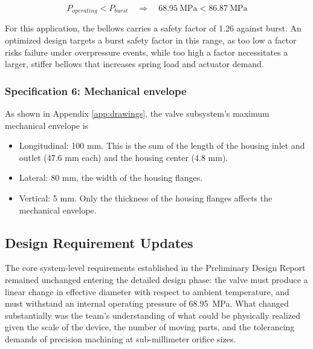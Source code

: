 \documentclass[12pt, letterpaper]{report}%
\newcounter{mycounter}           %
\newcounter{sub}[mycounter]      %
\newcommand{\specPressure}{68.95}%
\begin{document}
            \begin{equation}
            P_{operating} < P_{burst} \quad \Rightarrow \quad 68.95 \ \text{MPa} < 86.87 \ \text{MPa}
            \label{ineq_burst}
            \end{equation}

            For this application, the bellows carries a safety factor of 1.26 against burst.
            An optimized design targets a burst safety factor in this range, as too low a factor risks failure 
            under overpressure events, while too high a factor necessitates a larger, stiffer bellows that 
            increases spring load and actuator demand.

        \subsubsection{Specification 6: Mechanical envelope}
        \label{subsec:valve_spec_6}

            As shown in Appendix \ref{app:drawings}, the valve subsystem's maximum mechanical envelope is 
            \begin{itemize}
                \item Longitudinal: 100 mm. This is the sum of the length of the housing inlet and outlet (47.6 mm each) and the housing center (4.8 mm).
                \item Lateral: 80 mm, the width of the housing flanges.
                \item Vertical: 5 mm. Only the thickness of the housing flanges affects the mechanical envelope.
            \end{itemize}
        
        \subsection{Design Requirement Updates}
        \label{subsec:valve_req_updates}

                The core system-level requirements established in the Preliminary Design Report remained 
                unchanged entering the detailed design phase: the valve must produce a linear change in 
                effective diameter with respect to ambient temperature, and must withstand an internal 
                operating pressure of \specPressure\ MPa. What changed substantially was the team's understanding 
                of what could be physically realized given the scale of the device, the number of moving 
                parts, and the tolerancing demands of precision machining at sub-millimeter orifice sizes.
\end{document}
